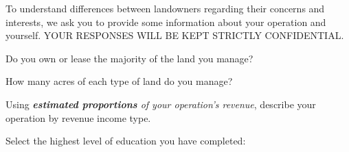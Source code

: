 \documentclass[
  english,
  ]{sdapsclassic}
\begin{document}
\begin{questionnaire}
  To understand differences between landowners regarding their concerns and interests, we ask you to provide some information about your operation and yourself. YOUR RESPONSES WILL BE KEPT STRICTLY CONFIDENTIAL.
    

    \begin{choicequestion}[cols=3]{Do you own or lease the majority of the land you manage?}
    \end{choicequestion}

    \begin{choicequestion}[cols=1]{How many acres of each type of land do you manage?}
    \end{choicequestion}      
    
    \begin{choicequestion}[cols=2]{Using \emph{\textbf{estimated proportions} of your operation's revenue}, describe your operation by revenue income type.}
    \end{choicequestion}     

    
    
    \begin{choicequestion}[cols=3]{Select the highest level of education you have completed:}
    \end{choicequestion}     
    

\end{questionnaire}
\end{document}
